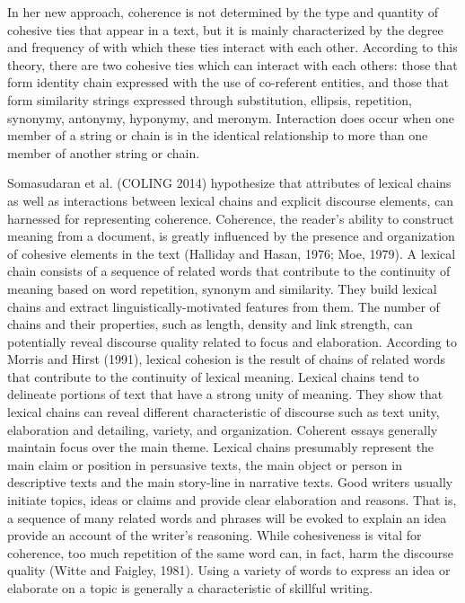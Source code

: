 In her new approach, coherence is not determined by the type and quantity of cohesive ties that appear in a text, but it is mainly characterized by the degree and frequency of with which these ties interact with each other. 
According to this theory, there are two cohesive ties which can interact with each others: those that form identity chain expressed with the use of co-referent entities, and those that form similarity strings expressed through substitution, ellipsis, repetition, synonymy, antonymy, hyponymy, and meronym. 
Interaction does occur when one member of a string or chain is in the identical relationship to more than one member of another string or chain.


Somasudaran et al. (COLING 2014) hypothesize that attributes of lexical chains as well as interactions between lexical chains and explicit discourse elements, can harnessed for representing coherence. 
Coherence, the reader's ability to construct meaning from a document, is greatly influenced by the presence and organization of cohesive elements in the text (Halliday and Hasan, 1976; Moe, 1979). 
A lexical chain consists of a sequence of related words that contribute to the continuity of meaning based on word repetition, synonym and similarity. 
They build lexical chains and extract linguistically-motivated features from them. 
The number of chains and their properties, such as length, density and link strength, can potentially reveal discourse quality related to focus and elaboration. 
According to Morris and Hirst (1991), lexical cohesion is the result of chains of related words that contribute to the continuity of lexical meaning. 
Lexical chains tend to delineate portions of text that have a strong unity of meaning. 
They show that lexical chains can reveal different characteristic of discourse such as text unity, elaboration and detailing, variety, and organization. 
Coherent essays generally maintain focus over the main theme. 
Lexical chains presumably represent the main claim or position in persuasive texts, the main object or person in descriptive texts and the main story-line in narrative texts. 
Good writers usually initiate topics, ideas or claims and provide clear elaboration and reasons. 
That is, a sequence of many related words and phrases will be evoked to explain an idea provide an account of the writer's reasoning. 
While cohesiveness is vital for coherence, too much repetition of the same word can, in fact, harm the discourse quality (Witte and Faigley, 1981). 
Using a variety of words to express an idea or elaborate on a topic is generally a characteristic of skillful writing. 
